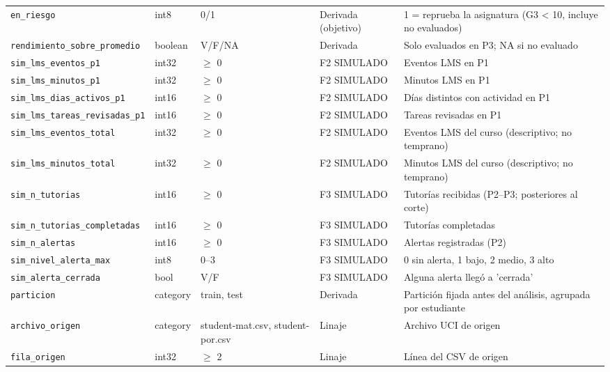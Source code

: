 \begin{tabular}{p{3.9cm}p{1.2cm}p{2.2cm}p{1.9cm}p{5.6cm}}
\texttt{en\_riesgo} & int8 & 0/1 & Derivada (objetivo) & 1 = reprueba la asignatura (G3 < 10, incluye no evaluados) \\
\texttt{rendimiento\_sobre\_promedio} & boolean & V/F/NA & Derivada & Solo evaluados en P3; NA si no evaluado \\
\texttt{sim\_lms\_eventos\_p1} & int32 & $\geq$ 0 & F2 SIMULADO & Eventos LMS en P1 \\
\texttt{sim\_lms\_minutos\_p1} & int32 & $\geq$ 0 & F2 SIMULADO & Minutos LMS en P1 \\
\texttt{sim\_lms\_dias\_activos\_p1} & int16 & $\geq$ 0 & F2 SIMULADO & Días distintos con actividad en P1 \\
\texttt{sim\_lms\_tareas\_revisadas\_p1} & int16 & $\geq$ 0 & F2 SIMULADO & Tareas revisadas en P1 \\
\texttt{sim\_lms\_eventos\_total} & int32 & $\geq$ 0 & F2 SIMULADO & Eventos LMS del curso (descriptivo; no temprano) \\
\texttt{sim\_lms\_minutos\_total} & int32 & $\geq$ 0 & F2 SIMULADO & Minutos LMS del curso (descriptivo; no temprano) \\
\texttt{sim\_n\_tutorias} & int16 & $\geq$ 0 & F3 SIMULADO & Tutorías recibidas (P2–P3; posteriores al corte) \\
\texttt{sim\_n\_tutorias\_completadas} & int16 & $\geq$ 0 & F3 SIMULADO & Tutorías completadas \\
\texttt{sim\_n\_alertas} & int16 & $\geq$ 0 & F3 SIMULADO & Alertas registradas (P2) \\
\texttt{sim\_nivel\_alerta\_max} & int8 & 0–3 & F3 SIMULADO & 0 sin alerta, 1 bajo, 2 medio, 3 alto \\
\texttt{sim\_alerta\_cerrada} & bool & V/F & F3 SIMULADO & Alguna alerta llegó a 'cerrada' \\
\texttt{particion} & category & train, test & Derivada & Partición fijada antes del análisis, agrupada por estudiante \\
\texttt{archivo\_origen} & category & student-mat.csv, student-por.csv & Linaje & Archivo UCI de origen \\
\texttt{fila\_origen} & int32 & $\geq$ 2 & Linaje & Línea del CSV de origen \\
\bottomrule
\end{tabular}
